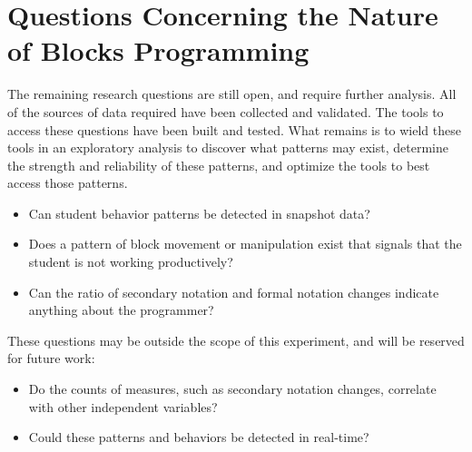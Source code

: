 \section{Questions Concerning the Nature of Blocks Programming}
The remaining research questions are still open, and require further analysis. All of the sources of data required have been collected and validated. The tools to access these questions have been built and tested. What remains is to wield these tools in an exploratory analysis to discover what patterns may exist, determine the strength and reliability of these patterns, and optimize the tools to best access those patterns.
\begin{itemize}
\item Can student behavior patterns be detected in snapshot data?
\item Does a pattern of block movement or manipulation exist that signals that the student is not working productively?
\item Can the ratio of secondary notation and formal notation changes indicate anything about the programmer?
\end{itemize}

These questions may be outside the scope of this experiment, and will be reserved for future work:
\begin{itemize}
\item Do the counts of measures, such as secondary notation changes, correlate with other independent variables?
\item Could these patterns and behaviors be detected in real-time?
\end{itemize}
